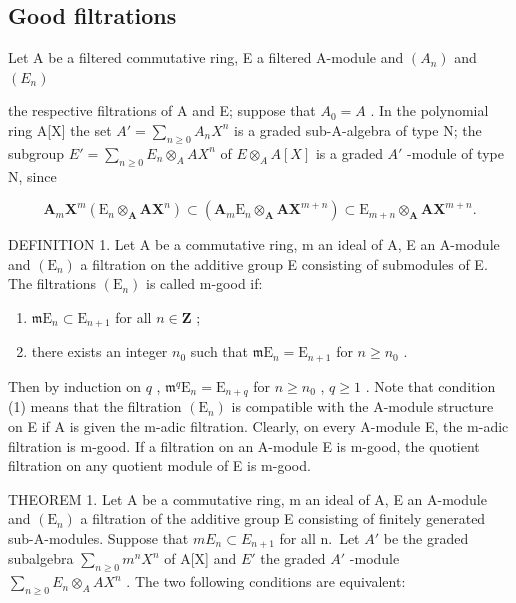 \subsection{Good filtrations}

Let A be a filtered commutative ring, E a filtered A-module and \((A_{n})\) and \((E_{n})\)

the respective filtrations of A and E; suppose that \(A_{0} = A\) . In the polynomial ring A{[}X{]} the set \(A' = \sum_{n \geqslant 0} A_{n} X^{n}\) is a graded sub-A-algebra of type N; the subgroup \(E' = \sum_{n \geqslant 0} E_{n} \otimes_{A} A X^{n}\) of \(E \otimes_{A} A[X]\) is a graded \(A'\) -module of type N, since

\[
\mathbf {A} _ {m} \mathbf {X} ^ {m} (\mathrm{E} _ {n} \otimes_ {\mathbf {A}} \mathbf {A X} ^ {n}) \subset (\mathbf {A} _ {m} \mathrm{E} _ {n} \otimes_ {\mathbf {A}} \mathbf {A X} ^ {m + n}) \subset \mathrm{E} _ {m + n} \otimes_ {\mathbf {A}} \mathbf {A X} ^ {m + n}.
\]

DEFINITION 1. Let A be a commutative ring, m an ideal of A, E an A-module and \((\mathrm{E}_{n})\) a filtration on the additive group E consisting of submodules of E. The filtrations \((\mathrm{E}_{n})\) is called m-good if:

\begin{enumerate}
\def\labelenumi{(\arabic{enumi})}
\item
  \(\mathfrak{m}\mathrm{E}_n\subset \mathrm{E}_{n + 1}\) for all \(n\in \mathbf{Z}\) ;
\item
  there exists an integer \(n_0\) such that \(\mathfrak{m}\mathrm{E}_n = \mathrm{E}_{n+1}\) for \(n \geqslant n_0\) .
\end{enumerate}

Then by induction on \(q\) , \(\mathfrak{m}^q\mathrm{E}_n = \mathrm{E}_{n + q}\) for \(n \geqslant n_0\) , \(q \geqslant 1\) . Note that condition (1) means that the filtration \((\mathrm{E}_n)\) is compatible with the A-module structure on E if A is given the m-adic filtration. Clearly, on every A-module E, the m-adic filtration is m-good. If a filtration on an A-module E is m-good, the quotient filtration on any quotient module of E is m-good.

THEOREM 1. Let A be a commutative ring, m an ideal of A, E an A-module and \((\mathrm{E}_{n})\) a filtration of the additive group E consisting of finitely generated sub-A-modules. Suppose that \(mE_{n} \subset E_{n+1}\) for all n.~Let \(A'\) be the graded subalgebra \(\sum_{n \geqslant 0} m^{n} X^{n}\) of A{[}X{]} and \(E'\) the graded \(A'\) -module \(\sum_{n \geqslant 0} E_{n} \otimes_{A} AX^{n}\) . The two following conditions are equivalent:

